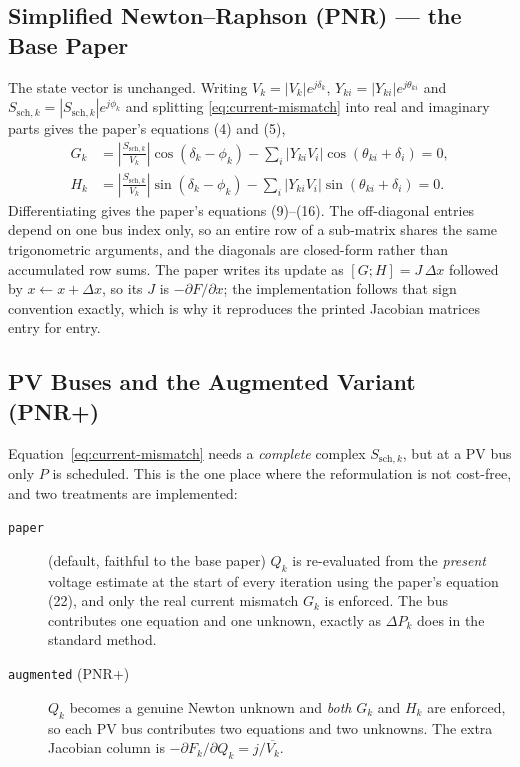 \documentclass[sigconf,nonacm]{acmart}
\begin{document}
\subsection{Simplified Newton--Raphson (PNR) --- the Base Paper}
The state vector is unchanged. Writing $V_k = |V_k|e^{j\delta_k}$,
$Y_{ki} = |Y_{ki}|e^{j\theta_{ki}}$ and
$S_{\mathrm{sch},k} = |S_{\mathrm{sch},k}|e^{j\phi_k}$ and splitting
\eqref{eq:current-mismatch} into real and imaginary parts gives the paper's
equations (4) and (5),
\begin{align}
G_k &= \left|\frac{S_{\mathrm{sch},k}}{V_k}\right|\cos(\delta_k-\phi_k)
       - \sum_i |Y_{ki}V_i|\cos(\theta_{ki}+\delta_i) = 0, \\
H_k &= \left|\frac{S_{\mathrm{sch},k}}{V_k}\right|\sin(\delta_k-\phi_k)
       - \sum_i |Y_{ki}V_i|\sin(\theta_{ki}+\delta_i) = 0 .
\end{align}
Differentiating gives the paper's equations (9)--(16). The off-diagonal entries
depend on one bus index only, so an entire row of a sub-matrix shares the same
trigonometric arguments, and the diagonals are closed-form rather than
accumulated row sums. The paper writes its update as $[G;H] = J\,\Delta x$
followed by $x \leftarrow x + \Delta x$, so its $J$ is $-\partial F/\partial x$;
the implementation follows that sign convention exactly, which is why it
reproduces the printed Jacobian matrices entry for entry.

\subsection{PV Buses and the Augmented Variant (PNR+)}
\label{sec:method-pv}
Equation~\eqref{eq:current-mismatch} needs a \emph{complete} complex
$S_{\mathrm{sch},k}$, but at a PV bus only $P$ is scheduled. This is the one
place where the reformulation is not cost-free, and two treatments are
implemented:

\begin{description}
\item[\texttt{paper}] (default, faithful to the base paper) $Q_k$ is
  re-evaluated from the \emph{present} voltage estimate at the start of every
  iteration using the paper's equation (22), and only the real current mismatch
  $G_k$ is enforced. The bus contributes one equation and one unknown, exactly
  as $\Delta P_k$ does in the standard method.
\item[\texttt{augmented} (PNR+)] $Q_k$ becomes a genuine Newton unknown and
  \emph{both} $G_k$ and $H_k$ are enforced, so each PV bus contributes two
  equations and two unknowns. The extra Jacobian column is
  $-\partial F_k/\partial Q_k = j/\overline{V_k}$.
\end{description}
\end{document}
